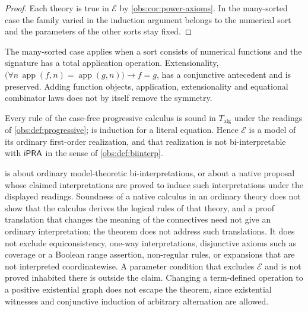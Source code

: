 \begin{proof}
Each theory is true in $\mathcal{E}$ by \cref{obs:cor:power-axioms}. In the
many-sorted case the family varied in the induction argument belongs to the
numerical sort and the parameters of the other sorts stay fixed.
\end{proof}

\begin{remark}
The many-sorted case applies when a sort consists of numerical functions and
the signature has a total application operation. Extensionality,
$\bigl(\forall n\,\operatorname{app}(f,n)=\operatorname{app}(g,n)\bigr)\to f=g$,
has a conjunctive antecedent and is preserved. Adding function objects,
application, extensionality and equational combinator laws does not by itself
remove the symmetry.
\end{remark}

\begin{corollary}
\label{obs:cor:casefree}
Every rule of the case-free progressive calculus is sound in $T_{\mathrm{alg}}$
under the readings of \cref{obs:def:progressive};  is induction
for a literal equation. Hence $\mathcal{E}$ is a model of its ordinary
first-order realization, and that realization is not bi-interpretable with
$\mathsf{iPRA}$ in the sense of \cref{obs:def:biinterp}.
\end{corollary}

\begin{remark}[Scope]
\label{obs:rem:symmetry-scope}
 is about ordinary model-theoretic bi-interpretations,
or about a native proposal whose claimed interpretations are proved to induce
such interpretations under the displayed readings. Soundness of a native
calculus in an ordinary theory does not show that the calculus derives the
logical rules of that theory, and a proof translation that changes the meaning
of the connectives need not give an ordinary interpretation; the theorem does
not address such translations. It does not exclude equiconsistency, one-way
interpretations, disjunctive axioms such as coverage or a Boolean range
assertion, non-regular rules, or expansions that are not interpreted
coordinatewise. A parameter condition that excludes $\mathcal{E}$ and is not
proved inhabited there is outside the claim. Changing a term-defined operation
to a positive existential graph does not escape the theorem, since existential
witnesses and conjunctive induction of arbitrary alternation are allowed.
\end{remark}

